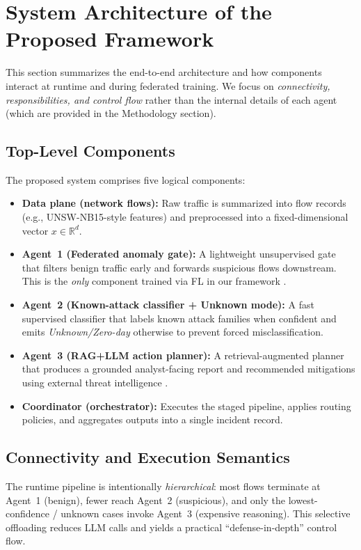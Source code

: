\documentclass[conference]{IEEEtran}
\begin{document}
\section{System Architecture of the Proposed Framework}
\label{sec:system_architecture}

This section summarizes the end-to-end architecture and how components interact at runtime and during federated training. We focus on \emph{connectivity, responsibilities, and control flow} rather than the internal details of each agent (which are provided in the Methodology section).

\subsection{Top-Level Components}
The proposed system comprises five logical components:
\begin{itemize}
  \item \textbf{Data plane (network flows):} Raw traffic is summarized into flow records (e.g., UNSW-NB15-style features) and preprocessed into a fixed-dimensional vector $x \in \mathbb{R}^d$.
  \item \textbf{Agent~1 (Federated anomaly gate):} A lightweight unsupervised gate that filters benign traffic early and forwards suspicious flows downstream. This is the \emph{only} component trained via FL in our framework \cite{mcmahan2017fedavg}.
  \item \textbf{Agent~2 (Known-attack classifier + Unknown mode):} A fast supervised classifier that labels known attack families when confident and emits \emph{Unknown/Zero-day} otherwise to prevent forced misclassification.
  \item \textbf{Agent~3 (RAG+LLM action planner):} A retrieval-augmented planner that produces a grounded analyst-facing report and recommended mitigations using external threat intelligence \cite{lewis2020rag,attck,cve,nist80061}.
  \item \textbf{Coordinator (orchestrator):} Executes the staged pipeline, applies routing policies, and aggregates outputs into a single incident record.
\end{itemize}

\subsection{Connectivity and Execution Semantics}
The runtime pipeline is intentionally \emph{hierarchical}: most flows terminate at Agent~1 (benign), fewer reach Agent~2 (suspicious), and only the lowest-confidence / unknown cases invoke Agent~3 (expensive reasoning). This selective offloading reduces LLM calls and yields a practical ``defense-in-depth'' control flow.
\end{document}
